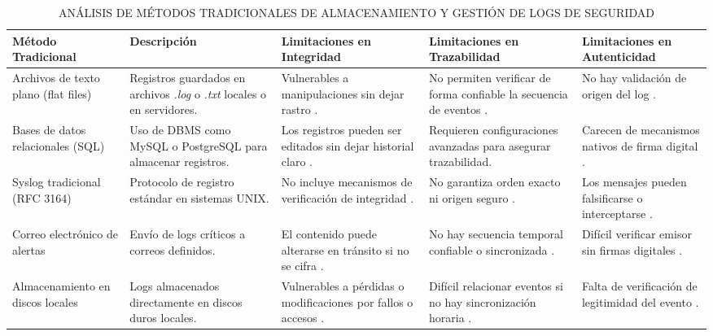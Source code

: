 \begin{table}[ht]
\centering
\captionsetup{list=no}
\caption{ANÁLISIS DE MÉTODOS TRADICIONALES DE ALMACENAMIENTO Y GESTIÓN DE LOGS DE SEGURIDAD}
\begin{tabularx}{\textwidth}{>{\raggedright\arraybackslash}X 
                                    >{\raggedright\arraybackslash}X 
                                    >{\raggedright\arraybackslash}X 
                                    >{\raggedright\arraybackslash}X 
                                    >{\raggedright\arraybackslash}X}
\toprule
\textbf{Método Tradicional} & \textbf{Descripción} & \textbf{Limitaciones en Integridad} & \textbf{Limitaciones en Trazabilidad} & \textbf{Limitaciones en Autenticidad} \\
\midrule
Archivos de texto plano (flat files) & Registros guardados en archivos \textit{.log} o \textit{.txt} locales o en servidores. & Vulnerables a manipulaciones sin dejar rastro \cite{casey2011}. & No permiten verificar de forma confiable la secuencia de eventos \cite{bishop2003}. & No hay validación de origen del log \cite{marty2008}. \\
\addlinespace
Bases de datos relacionales (SQL) & Uso de DBMS como MySQL o PostgreSQL para almacenar registros. & Los registros pueden ser editados sin dejar historial claro \cite{bishop2003}. & Requieren configuraciones avanzadas para asegurar trazabilidad. & Carecen de mecanismos nativos de firma digital \cite{casey2011}. \\
\addlinespace
Syslog tradicional (RFC 3164) & Protocolo de registro estándar en sistemas UNIX. & No incluye mecanismos de verificación de integridad \cite{gerhards2009}. & No garantiza orden exacto ni origen seguro \cite{gerhards2009}. & Los mensajes pueden falsificarse o interceptarse \cite{gerhards2009}. \\
\addlinespace
Correo electrónico de alertas & Envío de logs críticos a correos definidos. & El contenido puede alterarse en tránsito si no se cifra \cite{kent2006}. & No hay secuencia temporal confiable o sincronizada \cite{kent2006}. & Difícil verificar emisor sin firmas digitales \cite{kent2006}. \\
\addlinespace
Almacenamiento en discos locales & Logs almacenados directamente en discos duros locales. & Vulnerables a pérdidas o modificaciones por fallos o accesos \cite{kent2006}. & Difícil relacionar eventos si no hay sincronización horaria \cite{bishop2003}. & Falta de verificación de legitimidad del evento \cite{marty2008}. \\
\bottomrule
\end{tabularx}
\label{tab:analisis-logs}
\end{table}

